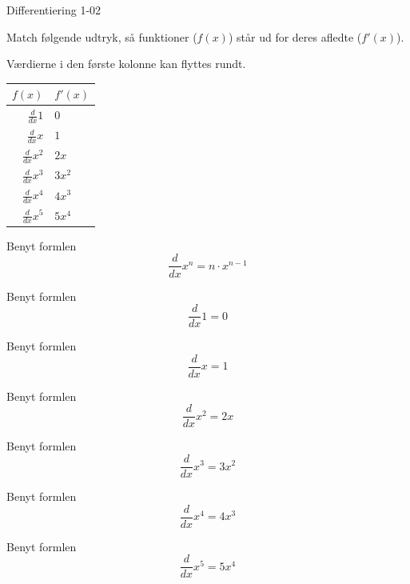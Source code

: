 \documentclass{article}
\newenvironment{sortingwidget}[2]{\begin{tabular}{|r|l|}
\hline #1 & #2 \\ \hline}{\hline
\end{tabular}}
\begin{document}
\begin{exercise}{Differentiering 1-02}

Match følgende udtryk, så funktioner ($f(x)$) står
ud for deres afledte ($f'(x)$).

Værdierne i den første kolonne kan flyttes rundt.


\begin{sortingwidget}{$f(x)$}{$f'(x)$}
$\frac{d}{dx} 1$ & $0$\\
$\frac{d}{dx} x$ & $1$ \\
$\frac{d}{dx} x^2$ & $2x$ \\
$\frac{d}{dx} x^3$ & $3x^2$ \\
$\frac{d}{dx} x^4$ & $4x^3$ \\
$\frac{d}{dx} x^5$ & $5x^4$ \\
\end{sortingwidget}


\hint
Benyt formlen
\[
\frac{d}{dx} x^n = n \cdot x^{n - 1}
\]


\hint
Benyt formlen
\[
\frac{d}{dx} 1 = 0
\]

\hint
Benyt formlen
\[
\frac{d}{dx} x = 1
\]


\hint
Benyt formlen
\[
\frac{d}{dx} x^2 = 2x
\]

\hint
Benyt formlen
\[
\frac{d}{dx} x^3 = 3x^2
\]

\hint
Benyt formlen
\[
\frac{d}{dx} x^4 = 4x^3
\]

\hint
Benyt formlen
\[
\frac{d}{dx} x^5 = 5x^4
\]



\end{exercise}
\end{document}
